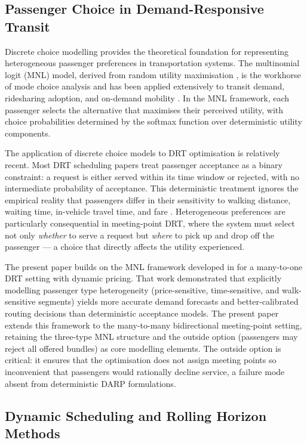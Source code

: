\subsection{Passenger Choice in Demand-Responsive Transit}

Discrete choice modelling provides the theoretical foundation for representing heterogeneous passenger preferences in transportation systems. The multinomial logit (MNL) model, derived from random utility maximisation \citep{benakiva1985}, is the workhorse of mode choice analysis and has been applied extensively to transit demand, ridesharing adoption, and on-demand mobility \citep{lavieri2019}. In the MNL framework, each passenger selects the alternative that maximises their perceived utility, with choice probabilities determined by the softmax function over deterministic utility components.

The application of discrete choice models to DRT optimisation is relatively recent. Most DRT scheduling papers treat passenger acceptance as a binary constraint: a request is either served within its time window or rejected, with no intermediate probability of acceptance. This deterministic treatment ignores the empirical reality that passengers differ in their sensitivity to walking distance, waiting time, in-vehicle travel time, and fare \citep{lavieri2019}. Heterogeneous preferences are particularly consequential in meeting-point DRT, where the system must select not only \emph{whether} to serve a request but \emph{where} to pick up and drop off the passenger — a choice that directly affects the utility experienced.

The present paper builds on the MNL framework developed in \citet{jin2024work1} for a many-to-one DRT setting with dynamic pricing. That work demonstrated that explicitly modelling passenger type heterogeneity (price-sensitive, time-sensitive, and walk-sensitive segments) yields more accurate demand forecasts and better-calibrated routing decisions than deterministic acceptance models. The present paper extends this framework to the many-to-many bidirectional meeting-point setting, retaining the three-type MNL structure and the outside option (passengers may reject all offered bundles) as core modelling elements. The outside option is critical: it ensures that the optimisation does not assign meeting points so inconvenient that passengers would rationally decline service, a failure mode absent from deterministic DARP formulations.

\subsection{Dynamic Scheduling and Rolling Horizon Methods}

